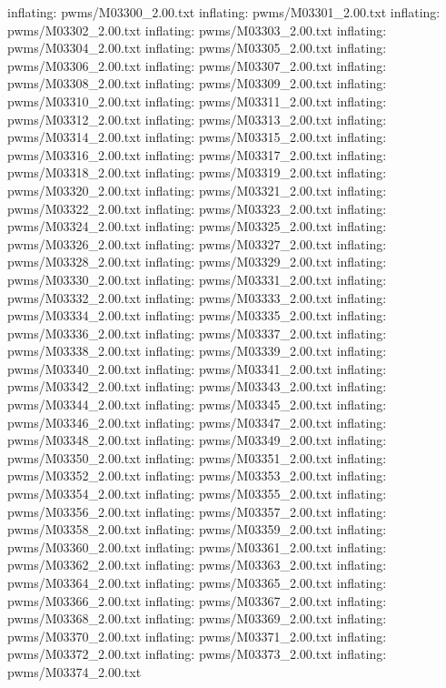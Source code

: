 \documentclass[letterpaper,10pt,english]{sphinxmanual}
\begin{document}
{\begin{sphinxVerbatim}[commandchars=\\\{\}]
  inflating: pwms/M03300\_2.00.txt
  inflating: pwms/M03301\_2.00.txt
  inflating: pwms/M03302\_2.00.txt
  inflating: pwms/M03303\_2.00.txt
  inflating: pwms/M03304\_2.00.txt
  inflating: pwms/M03305\_2.00.txt
  inflating: pwms/M03306\_2.00.txt
  inflating: pwms/M03307\_2.00.txt
  inflating: pwms/M03308\_2.00.txt
  inflating: pwms/M03309\_2.00.txt
  inflating: pwms/M03310\_2.00.txt
  inflating: pwms/M03311\_2.00.txt
  inflating: pwms/M03312\_2.00.txt
  inflating: pwms/M03313\_2.00.txt
  inflating: pwms/M03314\_2.00.txt
  inflating: pwms/M03315\_2.00.txt
  inflating: pwms/M03316\_2.00.txt
  inflating: pwms/M03317\_2.00.txt
  inflating: pwms/M03318\_2.00.txt
  inflating: pwms/M03319\_2.00.txt
  inflating: pwms/M03320\_2.00.txt
  inflating: pwms/M03321\_2.00.txt
  inflating: pwms/M03322\_2.00.txt
  inflating: pwms/M03323\_2.00.txt
  inflating: pwms/M03324\_2.00.txt
  inflating: pwms/M03325\_2.00.txt
  inflating: pwms/M03326\_2.00.txt
  inflating: pwms/M03327\_2.00.txt
  inflating: pwms/M03328\_2.00.txt
  inflating: pwms/M03329\_2.00.txt
  inflating: pwms/M03330\_2.00.txt
  inflating: pwms/M03331\_2.00.txt
  inflating: pwms/M03332\_2.00.txt
  inflating: pwms/M03333\_2.00.txt
  inflating: pwms/M03334\_2.00.txt
  inflating: pwms/M03335\_2.00.txt
  inflating: pwms/M03336\_2.00.txt
  inflating: pwms/M03337\_2.00.txt
  inflating: pwms/M03338\_2.00.txt
  inflating: pwms/M03339\_2.00.txt
  inflating: pwms/M03340\_2.00.txt
  inflating: pwms/M03341\_2.00.txt
  inflating: pwms/M03342\_2.00.txt
  inflating: pwms/M03343\_2.00.txt
  inflating: pwms/M03344\_2.00.txt
  inflating: pwms/M03345\_2.00.txt
  inflating: pwms/M03346\_2.00.txt
  inflating: pwms/M03347\_2.00.txt
  inflating: pwms/M03348\_2.00.txt
  inflating: pwms/M03349\_2.00.txt
  inflating: pwms/M03350\_2.00.txt
  inflating: pwms/M03351\_2.00.txt
  inflating: pwms/M03352\_2.00.txt
  inflating: pwms/M03353\_2.00.txt
  inflating: pwms/M03354\_2.00.txt
  inflating: pwms/M03355\_2.00.txt
  inflating: pwms/M03356\_2.00.txt
  inflating: pwms/M03357\_2.00.txt
  inflating: pwms/M03358\_2.00.txt
  inflating: pwms/M03359\_2.00.txt
  inflating: pwms/M03360\_2.00.txt
  inflating: pwms/M03361\_2.00.txt
  inflating: pwms/M03362\_2.00.txt
  inflating: pwms/M03363\_2.00.txt
  inflating: pwms/M03364\_2.00.txt
  inflating: pwms/M03365\_2.00.txt
  inflating: pwms/M03366\_2.00.txt
  inflating: pwms/M03367\_2.00.txt
  inflating: pwms/M03368\_2.00.txt
  inflating: pwms/M03369\_2.00.txt
  inflating: pwms/M03370\_2.00.txt
  inflating: pwms/M03371\_2.00.txt
  inflating: pwms/M03372\_2.00.txt
  inflating: pwms/M03373\_2.00.txt
  inflating: pwms/M03374\_2.00.txt

\end{sphinxVerbatim}}
\end{document}
